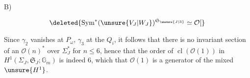 B)

\[
\deleted{\operatorname{Sym}^{*}(\unsure{V_J|W_J})^{\mathfrak S_{\unsure{J|3}}}\simeq\mathcal O[}
\]

Since $\gamma_2$ vanishes at  $P_\omega$,
$\gamma_3$ at the $Q_i$, it follows that there is no invariant section
of an $\mathcal O(n)^*$  over
$\Sigma_J^{*}$ 
for $n\le6$, hence that the order of
$\operatorname{cl}(\mathcal O(1))$ in
$H^1(\Sigma_J,\mathfrak S_J;\mathbb G_m)$ is indeed $6$,
which  that $\mathcal O(1)$ is a generator of the
mixed $\unsure{H^1}$.
